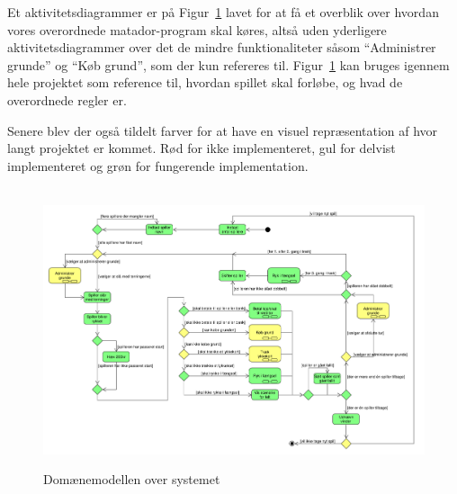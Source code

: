 \documentclass[class=article, crop=false]{standalone}
\begin{document}
    Et aktivitetsdiagrammer er på Figur~\ref{fig:activity_diagram}
    lavet for at få et overblik over hvordan vores overordnede matador-program skal køres, altså uden yderligere aktivitetsdiagrammer over det de mindre funktionaliteter såsom “Administrer grunde” og “Køb grund”, som der kun refereres til. Figur~\ref{fig:activity_diagram} kan bruges igennem hele projektet som reference til, hvordan spillet skal forløbe, og hvad de overordnede regler er.\par
    Senere blev der også tildelt farver for at have en visuel repræsentation af hvor langt projektet er kommet. Rød for ikke implementeret, gul for delvist implementeret og grøn for fungerende implementation.


    \begin{figure}[H]

        \hbox{\hspace{-3cm} \includegraphics[scale=0.455]{diagrams/activity_diagram.pdf}}

        \caption{Domænemodellen over systemet}\label{fig:activity_diagram}
    \end{figure}
\end{document}
